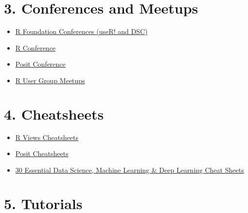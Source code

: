 \documentclass[
  letterpaper,
  DIV=11,
  numbers=noendperiod]{scrreprt}
\providecommand{\tightlist}{%
  \setlength{\itemsep}{0pt}\setlength{\parskip}{0pt}}\usepackage{longtable,booktabs,array}
\begin{document}
\hypertarget{conferences-and-meetups}{%
\section*{3. Conferences and Meetups}\label{conferences-and-meetups}}


\begin{itemize}
\tightlist
\item
  \href{https://www.r-project.org/conferences/}{R Foundation Conferences
  (useR! and DSC)}
\item
  \href{https://rstats.ai/}{R Conference}
\item
  \href{https://posit.co/conference/}{Posit Conference}
\item
  \href{https://www.meetup.com/pro/r-user-groups/}{R User Group Meetups}
\end{itemize}

\hypertarget{cheatsheets}{%
\section*{4. Cheatsheets}\label{cheatsheets}}


\begin{itemize}
\tightlist
\item
  \href{https://rviews.rstudio.com/2021/03/10/rstudio-open-source-resorurces/}{R
  Views Cheatsheets}
\item
  \href{https://posit.co/resources/cheatsheets/}{Posit Cheatsheets}
\item
  \href{https://www.kdnuggets.com/2017/09/essential-data-science-machine-learning-deep-learning-cheat-sheets.html}{30
  Essential Data Science, Machine Learning \& Deep Learning Cheat
  Sheets}
\end{itemize}

\hypertarget{tutorials}{%
\section*{5. Tutorials}\label{tutorials}}

\end{document}
